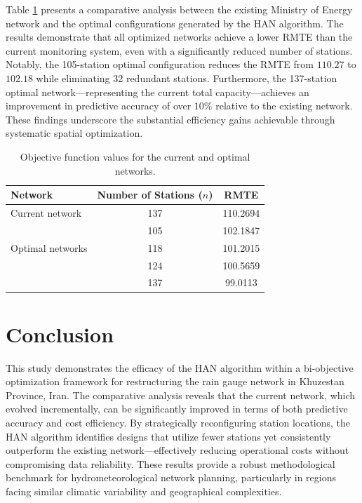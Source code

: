 \documentclass[twoside]{article}
\begin{document}
Table \ref{tab:results} presents a comparative analysis between the existing Ministry of Energy network and the optimal configurations generated by the HAN algorithm. The results demonstrate that all optimized networks achieve a lower RMTE than the current monitoring system, even with a significantly reduced number of stations. Notably, the 105-station optimal configuration reduces the RMTE from $110.27$ to $102.18$ while eliminating 32 redundant stations. Furthermore, the 137-station optimal network—representing the current total capacity—achieves an improvement in predictive accuracy of over $10\%$ relative to the existing network. These findings underscore the substantial efficiency gains achievable through systematic spatial optimization.
\begin{table}[!ht]
\begin{center}
	\caption{Objective function values for the current and optimal networks.}\label{tab:results}
\scriptsize
\begin{tabular}{lcc}
  \hline
  Network & Number of Stations ($n$) & RMTE \\ \hline
  Current network & 137 & 110.2694 \\ [3mm]
   & 105 & 102.1847 \\
  Optimal networks & 118 & 101.2015 \\
   & 124 & 100.5659 \\
   & 137 & 99.0113 \\ \hline
\end{tabular}
\end{center}
\end{table}

 \vspace*{-20mm}
\section*{Conclusion}
This study demonstrates the efficacy of the HAN algorithm within a bi-objective optimization framework for restructuring the rain gauge network in Khuzestan Province, Iran. The comparative analysis reveals that the current network, which evolved incrementally, can be significantly improved in terms of both predictive accuracy and cost efficiency. By strategically reconfiguring station locations, the HAN algorithm identifies designs that utilize fewer stations yet consistently outperform the existing network—effectively reducing operational costs without compromising data reliability. These results provide a robust methodological benchmark for hydrometeorological network planning, particularly in regions facing similar climatic variability and geographical complexities.
\end{document}
